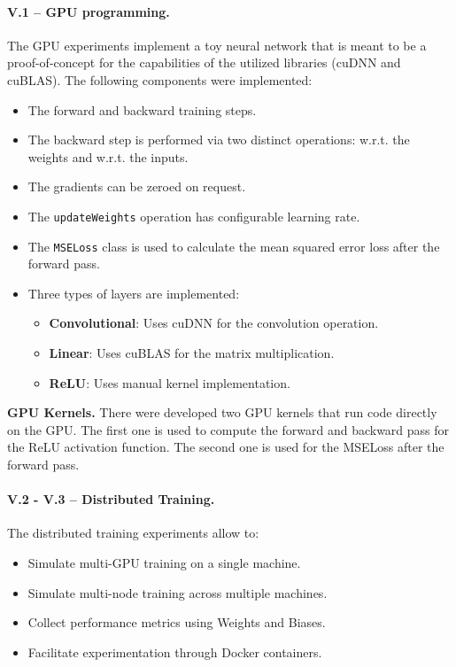 \paragraph{V.1 -- GPU programming.}
The GPU experiments implement a toy neural network that is meant to be a proof-of-concept for the
capabilities of the utilized libraries (cuDNN and cuBLAS). The following components were
implemented:

\begin{itemize}
	\item The forward and backward training steps.
	\item The backward step is performed via two distinct operations: w.r.t. the weights and w.r.t. the
	      inputs.
	\item The gradients can be zeroed on request.
	\item The \texttt{updateWeights} operation has configurable learning rate.
	\item The \texttt{MSELoss} class is used to calculate the mean squared error loss after the forward pass.
	\item Three types of layers are implemented:
	      \begin{itemize}
		      \item \textbf{Convolutional}: Uses cuDNN for the convolution operation.
		      \item \textbf{Linear}: Uses cuBLAS for the matrix multiplication.
		      \item \textbf{ReLU}: Uses manual kernel implementation.
	      \end{itemize}
\end{itemize}

\textbf{GPU Kernels.}
There were developed two GPU kernels that run code directly on the GPU. The first one is used
to compute the forward and backward pass for the ReLU activation function. The second one is used
for the MSELoss after the forward pass.

\paragraph{V.2 - V.3 -- Distributed Training.}
The distributed training experiments allow to:

\begin{itemize}
	\item Simulate multi-GPU training on a single machine.
	\item Simulate multi-node training across multiple machines.
	\item Collect performance metrics using Weights and Biases.
	\item Facilitate experimentation through Docker containers.
\end{itemize}

